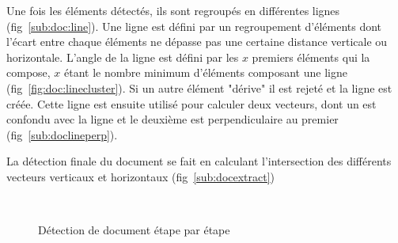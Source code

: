 Une fois les éléments détectés, ils sont regroupés en différentes lignes (fig~\ref{sub:doc:line}).
Une ligne est défini par un regroupement d'éléments dont l'écart entre chaque éléments ne dépasse pas une certaine distance verticale ou horizontale. L'angle de la ligne est défini par les $x$ premiers éléments qui la compose, $x$ étant le nombre minimum d'éléments composant une ligne (fig~\ref{fig:doc:linecluster}). Si un autre élément "dérive" il est rejeté et la ligne est créée. Cette ligne est ensuite utilisé pour calculer deux vecteurs, dont un est confondu avec la ligne et le deuxième est perpendiculaire au premier (fig~\ref{sub:doclineperp}).

La détection finale du document se fait en calculant l'intersection des différents vecteurs verticaux et horizontaux (fig~\ref{sub:docextract})

\begin{figure}[H]
    \centering
      \\
\caption{Détection de document étape par étape}
\label{fig:docdetection}
\end{figure}
	
